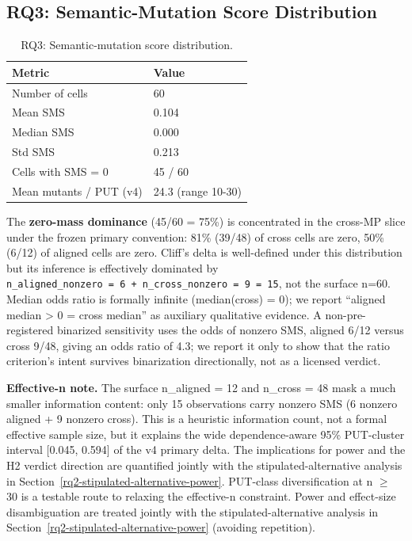 \documentclass[manuscript,screen,review]{acmart}
\begin{document}
\subsection{RQ3: Semantic-Mutation Score Distribution}\label{rq1-60-cell-distribution}

{%
\begin{longtable}[]{@{}ll@{}}
\caption{RQ3: Semantic-mutation score distribution.}\\
\toprule\noalign{}
Metric & Value \\
\midrule\noalign{}
\endhead
\bottomrule\noalign{}
\endlastfoot
Number of cells & 60 \\
Mean SMS & 0.104 \\
Median SMS & 0.000 \\
Std SMS & 0.213 \\
Cells with SMS = 0 & 45 / 60 \\
Mean mutants / PUT (v4) & 24.3 (range 10-30) \\
\end{longtable}
}

The \textbf{zero-mass dominance} (45/60 = 75\%) is concentrated in the
cross-MP slice under the frozen primary convention: 81\% (39/48) of
cross cells are zero,
50\% (6/12) of aligned cells are zero. Cliff's delta is
well-defined under this distribution but its inference is effectively
dominated by
\texttt{n\_aligned\_nonzero\ =\ 6\ +\ n\_cross\_nonzero\ =\ 9\ =\ 15}, not the
surface n=60. Median odds ratio is formally infinite (median(cross) =
0); we report ``aligned median \textgreater{} 0 = cross median'' as
auxiliary qualitative evidence. A non-pre-registered binarized
sensitivity uses the odds of nonzero SMS, aligned 6/12 versus cross
9/48, giving an odds ratio of 4.3; we report it only to show that the
ratio criterion's intent survives binarization directionally, not as a
licensed verdict.

\textbf{Effective-n note.} The surface n\_aligned = 12 and n\_cross = 48
mask a much smaller information content: only 15 observations carry
nonzero SMS (6 nonzero aligned + 9 nonzero cross). This is a heuristic
information count, not a formal effective sample size, but it explains the
wide dependence-aware 95\% PUT-cluster interval [0.045, 0.594] of the
v4 primary delta. The implications for power and the H2 verdict direction are
quantified jointly with the stipulated-alternative analysis in Section~\ref{rq2-stipulated-alternative-power}.
PUT-class diversification at n $\geq$ 30 is a testable route to relaxing
the effective-n constraint. Power and effect-size disambiguation are
treated jointly with the stipulated-alternative analysis in Section~\ref{rq2-stipulated-alternative-power}
(avoiding repetition).
\end{document}
